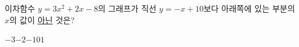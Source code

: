 \hspace*{2mm}\begin{minipage}[t]{\dimexpr\linewidth-2mm\relax}\vspace{0pt}
이차함수 $y=3x^2+2x-8$의 그래프가 직선 $y=-x+10$보다 아래쪽에 있는 부분의 $x$의 값이 \underline{아닌} 것은?
\begin{choices32}{$-3$}{$-2$}{$-1$}{$0$}{$1$}\end{choices32}\end{minipage}
